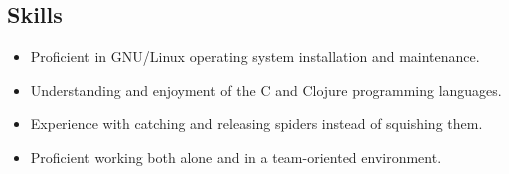 \documentclass[a4paper, oneside, final]{scrartcl}
\begin{document}
\begin{center}
\section{Skills}
\begin{multicols}{2}
\begin{itemize}
\item Proficient in GNU/Linux operating system installation and maintenance.
\item Understanding and enjoyment of the C and Clojure programming languages.
\item Experience with catching and releasing spiders instead of squishing them.
\item Proficient working both alone and in a team-oriented environment.
\end{itemize}
\end{multicols}
\end{center}
\end{document}
